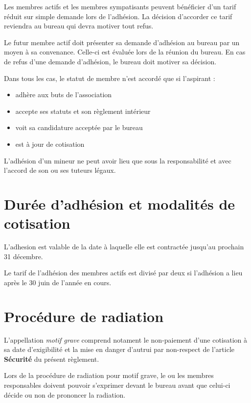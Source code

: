 \documentclass[a4paper, 11pt]{article}
\begin{document}
Les membres actifs et les membres sympatisants peuvent bénéficier d'un tarif réduit sur simple demande lors de l'adhésion.
La décision d'accorder ce tarif reviendra au bureau qui devra motiver tout refus.

Le futur membre actif doit présenter sa demande d'adhésion au bureau par un moyen à sa convenance.
Celle-ci est évaluée lors de la réunion du bureau. En cas de refus d'une demande d'adhésion, le bureau doit motiver sa décision.

Dans tous les cas, le statut de membre n'est accordé que si l'aspirant :

\begin{itemize}
	\item adhère aux buts de l'association
	\item accepte ses statuts et son règlement intérieur
	\item voit sa candidature acceptée par le bureau
	\item est à jour de cotisation
\end{itemize}

L'adhésion d'un mineur ne peut avoir lieu que sous la responsabilité et avec l'accord de son ou ses tuteurs légaux.


\section{Durée d'adhésion et modalités de cotisation} %

L'adhesion est valable de la date à laquelle elle est contractée jusqu'au prochain 31 décembre.

Le tarif de l'adhésion des membres actifs est divisé par deux si l'adhésion a lieu après le 30 juin de l'année en cours.


\section{Procédure de radiation} %

L'appellation \emph{\og{}motif grave\fg{}}  comprend notament le non-paiement d'une cotisation à sa date d'exigibilité et la mise en danger d'autrui par non-respect de l'article \textbf{Sécurité} du présent règlement.

Lors de la procédure de radiation pour motif grave, le ou les membres responsables doivent pouvoir s'exprimer devant le
bureau avant que celui-ci décide ou non de prononcer la radiation.
\end{document}
